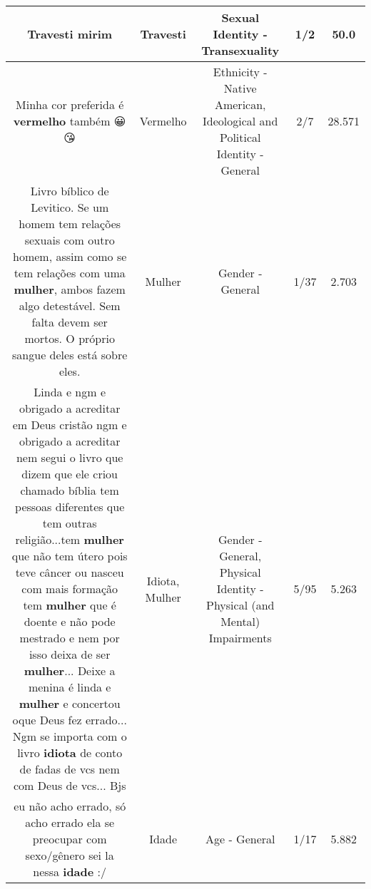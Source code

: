 \documentclass[11pt]{article}
\newlength\mylength
\begin{document}
\begin{center}
\begin{longtable}{|C{.65\mylength}|C{.30\mylength}|C{.12\mylength}|C{.12\mylength}|C{.12\mylength}|}
  \small Travesti mirim\normalsize   & Travesti & Sexual Identity - Transexuality & 1/2 & 50.0 \\  \hline
  \small Minha cor preferida é \textbf{v\textbf{ermelho}} também 😀😘\normalsize   & Vermelho & Ethnicity - Native American, Ideological and Political Identity - General & 2/7 & 28.571 \\  \hline
  \small Livro bíblico de Levitico. Se um homem tem relações sexuais com outro homem, assim como se tem relações com uma \textbf{mulher}, ambos fazem algo detestável. Sem falta devem ser mortos. O próprio sangue deles está sobre eles.\normalsize   & Mulher & Gender - General & 1/37 & 2.703 \\  \hline
  \small Linda e ngm e obrigado a acreditar em Deus cristão ngm e obrigado a acreditar nem segui o livro que dizem que ele criou chamado bíblia tem pessoas diferentes que tem outras religião...tem \textbf{mulher} que não tem útero pois teve câncer ou nasceu com mais formação tem \textbf{mulher} que é doente e não pode mestrado e nem por isso deixa de ser \textbf{mulher}... Deixe a menina é linda e \textbf{mulher} e concertou oque Deus fez errado... Ngm se importa com o livro \textbf{idiota} de conto de fadas de vcs nem com Deus de vcs... Bjs\normalsize   & Idiota, Mulher & Gender - General, Physical Identity - Physical (and Mental) Impairments & 5/95 & 5.263 \\  \hline
  \small eu não acho errado, só acho errado ela se preocupar com sexo/gênero sei la nessa \textbf{idade} :/\normalsize   & Idade & Age - General & 1/17 & 5.882 \\  \hline

\end{longtable}
\end{center}
\end{document}
